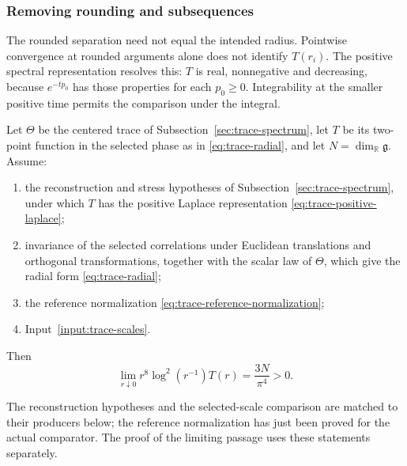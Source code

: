 

\subsubsection{Removing rounding and subsequences}
The rounded separation need not equal the intended radius. Pointwise
convergence at rounded arguments alone does not identify $T(r_i)$.
The positive spectral representation resolves this: $T$ is real,
nonnegative and decreasing, because $e^{-tp_0}$ has those properties for
each $p_0\geq0$. Integrability at the smaller positive time permits the
comparison under the integral.

\begin{theorem}\label{thm:trace-asymptotic}
Let $\Theta$ be the centered trace of Subsection~\ref{sec:trace-spectrum},
let $T$ be its two-point function in the selected phase as in
\eqref{eq:trace-radial}, and let $N=\dim_{\mathbb R}\mathfrak g$. Assume:
\begin{enumerate}
\item the reconstruction and stress hypotheses of
 Subsection~\ref{sec:trace-spectrum}, under which $T$ has the positive
 Laplace representation \eqref{eq:trace-positive-laplace};
\item invariance of the selected correlations under Euclidean translations
 and orthogonal transformations, together with the scalar law of
 $\Theta$, which give the radial form \eqref{eq:trace-radial};
\item the reference normalization
 \eqref{eq:trace-reference-normalization};
\item Input~\ref{input:trace-scales}.
\end{enumerate}
Then
\[
 \lim_{r\downarrow0}r^8\log^2(r^{-1})T(r)=\frac{3N}{\pi^4}>0.
\]
\end{theorem}
The reconstruction hypotheses and the selected-scale comparison are
matched to their producers below; the reference normalization has just
been proved for the actual comparator. The proof of the limiting passage
uses these statements separately.
